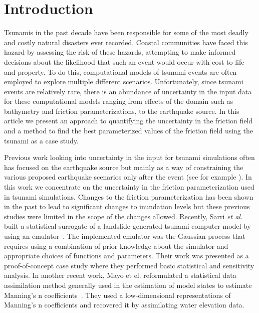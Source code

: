 
\section{Introduction}

Tsunamis in the past decade have been responsible for some of the most deadly and costly natural disasters ever recorded.  Coastal communities have faced this hazard by assessing the risk of these hazards, attempting to make informed decisions about the likelihood that such an event would occur with cost to life and property.  To do this, computational models of tsunami events are often employed to explore multiple different scenarios.  Unfortunately, since tsunami events are relatively rare, there is an abundance of uncertainty in the input data for these computational models ranging from effects of the domain such as bathymetry and friction parameterizations, to the earthquake source.  In this article we present an approach to quantifying the uncertainty in the friction field and a method to find the best parameterized values of the friction field using the \tohoku tsunami as a case study.

Previous work looking into uncertainty in the input for tsunami simulations often has focused on the earthquake source but mainly as a way of constraining the various proposed earthquake scenarios only after the event (see for example \cite{MacInnes:2013cr}).  In this work we concentrate on the uncertainty in the friction parameterization used in tsunami simulations.  Changes to the friction parameterization has been shown in the past to lead to significant changes to inundation levels \cite{Myers:2001el,Jakeman:2010hk} but these previous studies were limited in the scope of the changes allowed.  Recently, Sarri \emph{et al.} built a statistical surrogate of a landslide-generated tsunami computer model by using an emulator~\cite{Sarri2012}. The implemented emulator was the Gaussian process
that requires using a combination of prior knowledge about the simulator and
appropriate choices of functions and parameters. Their work was presented as a proof-of-concept case study
where they performed basic statistical and sensitivity analysis.
In another recent work, Mayo et el. reformulated a statistical data assimilation method generally used in the estimation of model states to estimate Manning’s n coefficients~\cite{Mayo2013}. 
They used a low-dimensional representations of Manning’s n coefficients and recovered it by assimilating
water elevation data.


